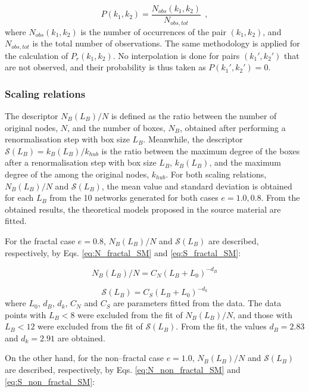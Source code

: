 \begin{equation}
	P(k_1, k_2) = \frac{N_{obs}(k_1, k_2)}{N_{obs, tot}} \ \ ,
	\label{eq:P_joint_task_6_SM}
\end{equation}
where $N_{obs}(k_1, k_2)$ is the number of occurrences of the pair $(k_1, k_2)$, and $N_{obs, tot}$ is the total number of observations. The same methodology is applied for the calculation of $P_r(k_1, k_2)$. No interpolation is done for pairs $(k_1', k_2')$ that are not observed, and their probability is thus taken as $P(k_1', k_2') = 0$.


\subsubsection*{Scaling relations}

The descriptor $N_B(L_B) / N$ is defined as the ratio between the number of original nodes, $N$, and the number of boxes, $N_B$, obtained after performing a renormalisation step with box size $L_B$. Meanwhile, the descriptor $\mathcal{S}(L_B) = k_B(L_B) / k_{hub}$ is the ratio between the maximum degree of the boxes after a renormalisation step with box size $L_B$, $k_B(L_B)$, and the maximum degree of the among the original nodes, $k_{hub}$. For both scaling relations, $N_B(L_B) / N$ and $\mathcal{S}(L_B)$, the mean value and standard deviation is obtained for each $L_B$ from the 10 networks generated for both cases $e=1.0, 0.8$. From the obtained results, the theoretical models proposed in the source material \cite{song2006origins} are fitted. 

For the fractal case $e=0.8$, $N_B(L_B) / N$ and $\mathcal{S}(L_B)$ are described, respectively, by Eqs. \ref{eq:N_fractal_SM} and \ref{eq:S_fractal_SM}:

\begin{equation}
	N_B(L_B) / N = C_N (L_B + L_0)^{-d_B}
	\label{eq:N_fractal_SM}
\end{equation}

\begin{equation}
	\mathcal{S}(L_B) = C_S (L_B + L_0)^{-d_k}
	\label{eq:S_fractal_SM}
\end{equation}
where $L_0$, $d_B$, $d_k$, $C_N$ and $C_S$ are parameters fitted from the data. The data points with $L_B < 8$ were excluded from the fit of $N_B(L_B) / N$, and those with $L_B < 12$ were excluded from the fit of $\mathcal{S}(L_B)$. From the fit, the values $d_B = 2.83$ and $d_k = 2.91$ are obtained. 

On the other hand, for the non--fractal case $e=1.0$, $N_B(L_B) / N$ and $\mathcal{S}(L_B)$ are described, respectively, by Eqs. \ref{eq:N_non_fractal_SM} and \ref{eq:S_non_fractal_SM}:


